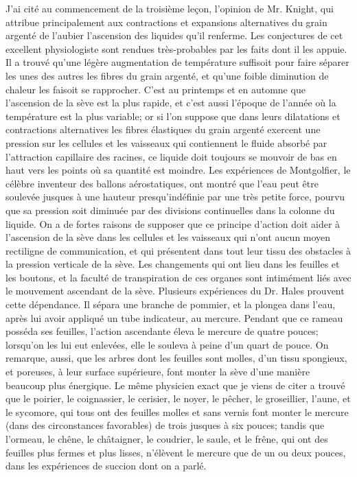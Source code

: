 J'ai cité au commencement de la troisième leçon, l'opinion de Mr. Knight, qui attribue principalement aux contractions et expansions alternatives du grain argenté de l'aubier l'ascension des liquides qu'il renferme. Les conjectures de cet excellent physiologiste sont rendues très-probables par les faits dont il les appuie. Il a trouvé qu'une légère augmentation de température suffisoit pour faire séparer les unes des autres les fibres du grain argenté, et qu'une foible diminution de chaleur les faisoit se rapprocher. C'est au printemps et en automne que l'ascension de la sève est la plus rapide, et c'est aussi l'époque de l'année où la température est la plus variable; or si l'on suppose que dans leurs dilatations et contractions alternatives les fibres élastiques du grain argenté exercent une pression sur les\setcounter{page}{92} cellules et les vaisseaux qui contiennent le fluide absorbé par l'attraction capillaire des racines, ce liquide doit toujours se mouvoir de bas en haut vers les points où sa quantité est moindre.
Les expériences de Montgolfier, le célèbre inventeur des ballons aérostatiques, ont montré que l'eau peut être soulevée jusques à une hauteur presqu'indéfinie par une très petite force, pourvu que sa pression soit diminuée par des divisions continuelles dans la colonne du liquide. On a de fortes raisons de supposer que ce principe d'action doit aider à l'ascension de la sève dans les cellules et les vaisseaux qui n'ont aucun moyen rectiligne de communication, et qui présentent dans tout leur tissu des obstacles à la pression verticale de la sève.
Les changements qui ont lieu dans les feuilles et les boutons, et la faculté de transpiration de ces organes sont intimément liés avec le mouvement ascendant de la sève. Plusieurs expériences du Dr. Hales prouvent cette dépendance.
Il sépara une branche de pommier, et la plongea dans l'eau, après lui avoir appliqué un tube indicateur, au mercure. Pendant que ce rameau posséda ses feuilles, l'action ascendante éleva le mercure de quatre\setcounter{page}{93} pouces; lorsqu'on les lui eut enlevées, elle le souleva à peine d'un quart de pouce.
On remarque, aussi, que les arbres dont les feuilles sont molles, d'un tissu spongieux, et poreuses, à leur surface supérieure, font monter la sève d'une manière beaucoup plus énergique.
Le même physicien exact que je viens de citer a trouvé que le poirier, le coignassier, le cerisier, le noyer, le pêcher, le groseillier, l'aune, et le sycomore, qui tous ont des feuilles molles et sans vernis font monter le mercure (dans des circonstances favorables) de trois jusques à six pouces; tandis que l'ormeau, le chêne, le châtaigner, le coudrier, le saule, et le frêne, qui ont des feuilles plus fermes et plus lisses, n'élèvent le mercure que de un ou deux pouces, dans les expériences de succion dont on a parlé.
